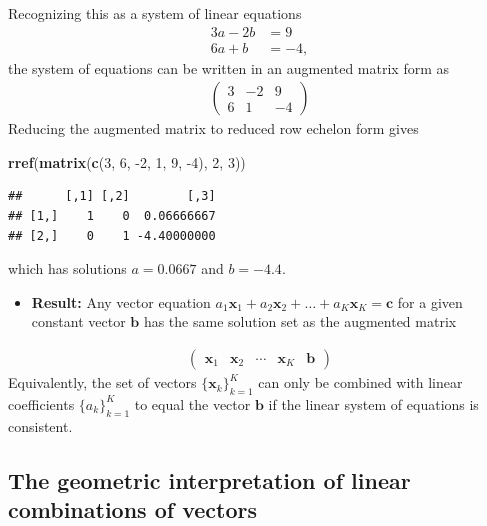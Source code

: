 \documentclass[
]{book}
\newenvironment{Shaded}{\begin{snugshade}}{\end{snugshade}}
\newcommand{\DecValTok}[1]{\textcolor[rgb]{0.00,0.00,0.81}{#1}}
\newcommand{\KeywordTok}[1]{\textcolor[rgb]{0.13,0.29,0.53}{\textbf{#1}}}
\newcommand{\NormalTok}[1]{#1}
\providecommand{\tightlist}{%
  \setlength{\itemsep}{0pt}\setlength{\parskip}{0pt}}
\theoremstyle{definition}
\theoremstyle{definition}
\theoremstyle{definition}
\theoremstyle{definition}
\theoremstyle{remark}
\begin{document}
Recognizing this as a system of linear equations
\[
\begin{aligned}
3a - 2b & = 9 \\ 
6a + b & = -4,
\end{aligned}
\]
the system of equations can be written in an augmented matrix form as
\[
\begin{aligned}
\begin{pmatrix}
3  & - 2 & 9\\
6  &   1 & -4 
\end{pmatrix}
\end{aligned}
\]
Reducing the augmented matrix to reduced row echelon form gives

\begin{Shaded}
\begin{Highlighting}[]
\KeywordTok{rref}\NormalTok{(}\KeywordTok{matrix}\NormalTok{(}\KeywordTok{c}\NormalTok{(}\DecValTok{3}\NormalTok{, }\DecValTok{6}\NormalTok{, }\DecValTok{-2}\NormalTok{, }\DecValTok{1}\NormalTok{, }\DecValTok{9}\NormalTok{, }\DecValTok{-4}\NormalTok{), }\DecValTok{2}\NormalTok{, }\DecValTok{3}\NormalTok{))}
\end{Highlighting}
\end{Shaded}

\begin{verbatim}
##      [,1] [,2]        [,3]
## [1,]    1    0  0.06666667
## [2,]    0    1 -4.40000000
\end{verbatim}

which has solutions \(a = 0.0667\) and \(b = -4.4\).

\begin{itemize}
\tightlist
\item
  \textbf{Result:} Any vector equation \(a_1 \mathbf{x}_1 + a_2 \mathbf{x}_2 + \ldots + a_K \mathbf{x}_K = \mathbf{c}\) for a given constant vector \(\mathbf{b}\) has the same solution set as the augmented matrix
\end{itemize}

\[
\begin{aligned}
\begin{pmatrix} \mathbf{x}_1 & \mathbf{x}_2 & \cdots & \mathbf{x}_K & \mathbf{b} \end{pmatrix}
\end{aligned}
\]
Equivalently, the set of vectors \(\{\mathbf{x}_k\}_{k=1}^K\) can only be combined with linear coefficients \(\{a_k\}_{k=1}^K\) to equal the vector \(\mathbf{b}\) if the linear system of equations is consistent.

\hypertarget{the-geometric-interpretation-of-linear-combinations-of-vectors}{%
\subsection{The geometric interpretation of linear combinations of vectors}\label{the-geometric-interpretation-of-linear-combinations-of-vectors}}
\end{document}
